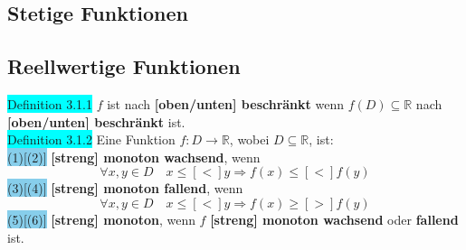 \documentclass[landscape, 10pt]{article}
\newcommand{\R}{\mathbb{R}}
\begin{document}
\begin{multicols}{3}
\section{Stetige Funktionen}
       \subsection{Reellwertige Funktionen}
              \colorbox{cyan}{Definition 3.1.1} 
                     $f$ ist nach 
                     \textbf{[oben/unten] beschränkt} wenn 
                     \textcolor{NavyBlue}{$f(D)\subseteq\R$} 
                     nach \textbf{[oben/unten] beschränkt} ist.\\
              \colorbox{cyan}{Definition 3.1.2} 
                     Eine Funktion $f:D\longrightarrow\R$, wobei 
                     $D\subseteq\R$, ist:\\
                     \colorbox{SkyBlue}{(1)[(2)]}
                            \textbf{[streng] monoton 
                            wachsend}, wenn 
                            \begin{equation*}
                                   \forall x,y\in D\quad 
                                   x\leqslant [<]y\Rightarrow
                                   f(x)\leqslant [<]f(y)
                            \end{equation*}
                     \colorbox{SkyBlue}{(3)[(4)]}
                            \textbf{[streng] monoton 
                            fallend}, wenn 
                            \begin{equation*}
                                   \forall x,y\in D\quad 
                                   x\leqslant [<]y\Rightarrow
                                   f(x)\geqslant [>]f(y)
                            \end{equation*}
                     \colorbox{SkyBlue}{(5)[(6)]} 
                            \textbf{[streng] monoton}, 
                            wenn \textcolor{NavyBlue}{$f$} 
                            \textbf{[streng] monoton wachsend} oder 
                            \textbf{fallend} ist.\\

\end{multicols}
\end{document}
